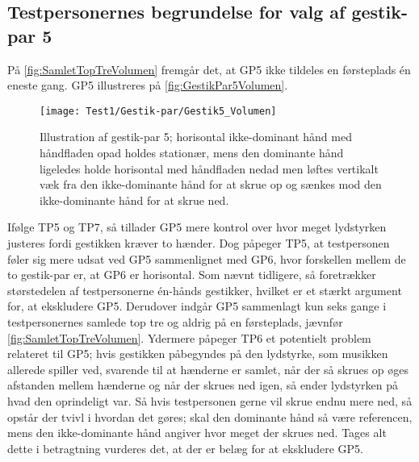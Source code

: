 \subsection{Testpersonernes begrundelse for valg af gestik-par 5}
\label{TestresultaterValgAfGestikkerBegrundelseGP5Volumen}
% 
På \autoref{fig:SamletTopTreVolumen} fremgår det, at GP5 ikke tildeles en førsteplads én eneste gang. GP5 illustreres på \autoref{fig:GestikPar5Volumen}.  
%
\begin{figure}[H]
	\centering
	\texttt{[image: Test1/Gestik-par/Gestik5\_Volumen]}
	\caption{Illustration af gestik-par 5; horisontal ikke-dominant hånd med håndfladen opad holdes stationær, mens den dominante hånd ligeledes holde horisontal med håndfladen nedad men løftes vertikalt væk fra den ikke-dominante hånd for at skrue op og sænkes mod den ikke-dominante hånd for at skrue ned.}
	\label{fig:GestikPar5Volumen}
\end{figure}
\noindent
%
Ifølge TP5 og TP7, så tillader GP5 mere kontrol over hvor meget lydstyrken justeres fordi gestikken kræver to hænder. Dog påpeger TP5, at testpersonen føler sig mere udsat ved GP5 sammenlignet med GP6, hvor forskellen mellem de to gestik-par er, at GP6 er horisontal.\blankline
%
Som nævnt tidligere, så foretrækker størstedelen af testpersonerne én-hånds gestikker, hvilket er et stærkt argument for, at ekskludere GP5. Derudover indgår GP5 sammenlagt kun seks gange i testpersonernes samlede top tre og aldrig på en førsteplads, jævnfør \autoref{fig:SamletTopTreVolumen}. Ydermere påpeger TP6 et potentielt problem relateret til GP5; hvis gestikken påbegyndes på den lydstyrke, som musikken allerede spiller ved, svarende til at hænderne er samlet, når der så skrues op øges afstanden mellem hænderne og når der skrues ned igen, så ender lydstyrken på hvad den oprindeligt var. Så hvis testpersonen gerne vil skrue endnu mere ned, så opstår der tvivl i hvordan det gøres; skal den dominante hånd så være referencen, mens den ikke-dominante hånd angiver hvor meget der skrues ned. Tages alt dette i betragtning vurderes det, at der er belæg for at ekskludere GP5.
%
